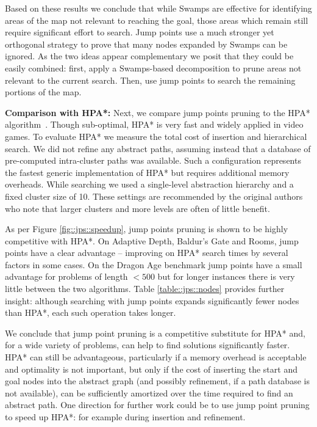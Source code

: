 Based on these results we conclude that while Swamps are effective for
identifying areas of the map not relevant to reaching the goal, those areas
which remain still require significant effort to search.  Jump points use a much
stronger yet orthogonal strategy to prove that many nodes expanded by Swamps can
be ignored.  As the two ideas appear complementary we posit that they could be
easily combined: first, apply a Swamps-based decomposition to prune areas not
relevant to the current search.  Then, use jump points to search the remaining
portions of the map.

\textbf{Comparison with HPA*: }
Next, we compare jump points pruning to the HPA* algorithm~\cite{botea04}.
Though sub-optimal, HPA* is very fast and widely applied in video games. 
To evaluate HPA* we measure the total cost
of insertion and hierarchical search. We did not refine any abstract paths,
assuming instead that a database of pre-computed intra-cluster paths was
available. Such a configuration represents the fastest generic implementation 
of HPA* but requires additional memory overheads. 
While searching we used a single-level abstraction hierarchy and a
fixed cluster size of 10.  These settings are recommended by the original
authors who note that larger clusters and more levels are often of little
benefit.

As per Figure \ref{fig::jps::speedup}, jump points pruning is shown to be 
highly competitive with HPA*.
On Adaptive Depth, Baldur's Gate and Rooms, jump points have a clear advantage
-- improving on HPA* search times by several factors in some cases.
On the Dragon Age benchmark jump points have a small advantage for problems of 
length $< 500$ but for longer instances there is very little between the two
algorithms.
Table \ref{table::jps::nodes} provides further insight: although searching with jump 
points expands significantly fewer nodes than HPA*, each such operation
takes longer.

We conclude that jump point pruning is a competitive substitute for HPA* and,
for a wide variety of problems, can help to find solutions significantly faster.
HPA*
can still be advantageous, particularly if a memory overhead is acceptable
and optimality is not important, but only if the cost of inserting the start and
goal nodes into the abstract graph (and possibly refinement, if a path database
is not available), can be sufficiently amortized over the time required to find an abstract
path.
One direction for further work could be to use jump
point pruning to speed up HPA*: for example during insertion and refinement.
